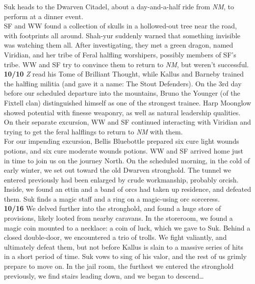 \documentclass[letterpaper]{article}
\begin{document}
\noindent Suk heads to the Dwarven Citadel, about a day-and-a-half ride from \emph{NM}, to perform at a dinner event. \\

\noindent SF and WW found a collection of skulls in a hollowed-out tree near the road, with footprints all around.  Shah-yur suddenly warned that something invisible was watching them all.  After investigating, they met a green dragon, named Viridian, and her tribe of Feral halfling worshipers, possibly members of SF's tribe.  WW and SF try to convince them to return to \emph{NM}, but weren't successful. \\

\noindent \textbf{10/10} \emph{Z} read his Tome of Brilliant Thought, while Kallus and Barneby trained the halfling militia (and gave it a name: The Stout Defenders). On the 3rd day before our scheduled departure into the mountains, Bruno the Younger (of the Fixtell clan) distinguished himself as one of the strongest trainee.  Harp Moonglow showed potential with finesse weaponry, as well as natural leadership qualities.  \\

\noindent On their separate excursion, WW and SF continued interacting with Viridian and trying to get the feral halflings to return to \emph{NM} with them.  \\

\noindent For our impending excursion, Bellis Bluebottle prepared six cure light wounds potions, and six cure moderate wounds potions.  WW and SF arrived home just in time to join us on the journey North.  On the scheduled morning, in the cold of early winter, we set out toward the old Dwarven stronghold.  The tunnel we entered previously had been enlarged by crude workmanship, probably orcish.  Inside, we found an ettin and a band of orcs had taken up residence, and defeated them. Suk finds a magic staff and a ring on a magic-using orc sorceress. \\

\noindent \textbf{10/16} We delved further into the stronghold, and found a huge store of provisions, likely looted from nearby caravans.  In the storeroom, we found a magic coin mounted to a necklace: a coin of luck, which we gave to Suk.  Behind a closed double-door, we encountered a trio of trolls.  We fight valiantly, and ultimately defeat them, but not before Kallus is slain to a massive series of hits in a short period of time. Suk vows to sing of his valor, and the rest of us grimly prepare to move on.  In the jail room, the furthest we entered the stronghold previously, we find stairs leading down, and we began to descend\ldots \\
\end{document}
